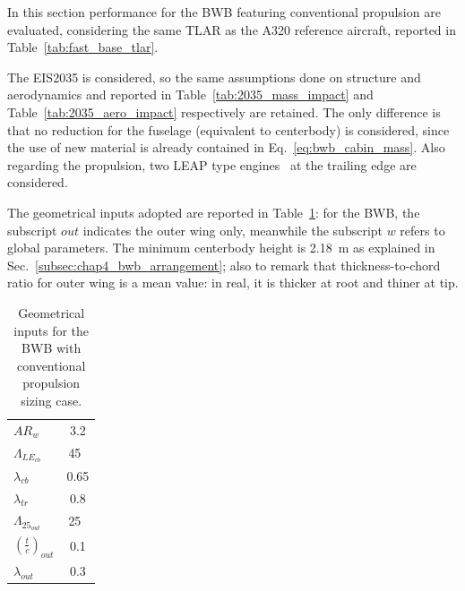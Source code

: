In this section performance for the BWB featuring conventional propulsion are evaluated, considering the same TLAR as the A320 reference aircraft, reported in Table~\ref{tab:fast_base_tlar}. 

The EIS2035 is considered, so the same assumptions done on structure and aerodynamics and reported in Table~\ref{tab:2035_mass_impact} and Table~\ref{tab:2035_aero_impact} respectively are retained.
The only difference is that no reduction for the fuselage (equivalent to centerbody) is considered, since the use of new material is already contained in Eq.~\eqref{eq:bwb_cabin_mass}.
Also regarding the propulsion, two LEAP type engines~\cite{bib:leap_engine} at the trailing edge are considered. 

The geometrical inputs adopted are reported in Table~\ref{tab:bwb_conv_geom_inp}: for the BWB, the subscript $out$ indicates the outer wing only, meanwhile the subscript $w$ refers to global parameters.
The minimum centerbody height is 2.18~\si{\meter} as explained in Sec.~\ref{subsec:chap4_bwb_arrangement}; also to remark that thickness-to-chord ratio for outer wing is a mean value: in real, it is thicker at root and thiner at tip. 
\begin{table}[!h]
	\centering
	\begin{tabular}{l c}
		\hline
		$AR_w$ & 3.2 \\
		$\Lambda_{LE_{cb}}$ & 45~\si{\deg} \\
		$\lambda_{cb}$ & 0.65 \\
		$\lambda_{tr}$ & 0.8 \\
		$\Lambda_{25_{out}}$ & 25~\si{\deg} \\
		$\left(\frac{t}{c}\right)_{out}$ & 0.1 \\
		$\lambda_{out}$ & 0.3 \\
		\hline
	\end{tabular}
	\caption{Geometrical inputs for the BWB with conventional propulsion sizing case.}
	\label{tab:bwb_conv_geom_inp}
\end{table}

